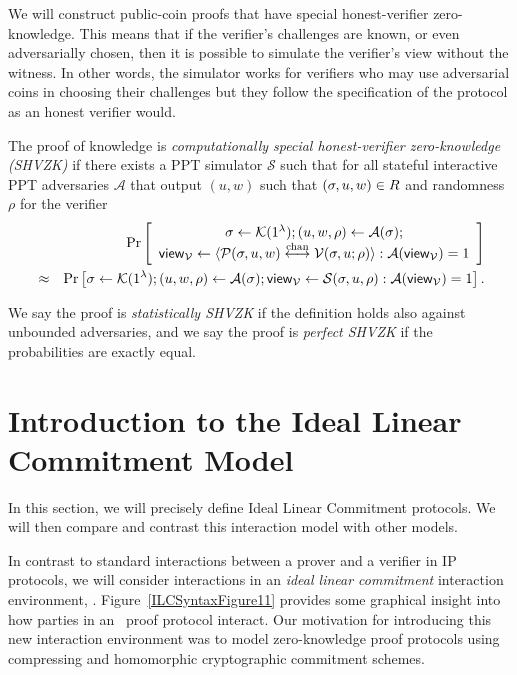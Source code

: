 We will construct public-coin proofs that have special honest-verifier zero-knowledge. This means that if the verifier's challenges are known, or even adversarially chosen, then it is possible to simulate the verifier's view without the witness.  In other words, the simulator works for verifiers who may use adversarial coins in choosing their challenges but they follow the specification of the protocol as an honest verifier would. 
\begin{definition}
The proof of knowledge is \emph{computationally special honest-verifier zero-knowledge (SHVZK)} if there exists a PPT simulator $\mathcal{S}$ such that for all stateful interactive PPT adversaries $\mathcal{A}$ that output $(u,w)$ such that $(\mathsf{\sigma},u,w)\in R$ and randomness $\rho$ for the verifier
\begin{eqnarray*}
&&\Pr \left[ \begin{array}{c}\mathsf{\sigma}\gets \mathcal{K}(1^{\lambda});(u, w, \rho) \leftarrow\mathcal{A}(\mathsf{\sigma}); \\
\mathsf{view}_{\mathcal{V}}\leftarrow \langle \mathcal{P}(\mathsf{\sigma},u,w)\overset{\textnormal{chan}}{\longleftrightarrow} \mathcal{V}(\mathsf{\sigma},u;\rho)\rangle: \mathcal{A}(\mathsf{view}_{\mathcal{V}})=1\end{array} \right]\\
&\approx &\Pr \left[ \mathsf{\sigma}\gets \mathcal{K}(1^{\lambda});(u, w, \rho) \leftarrow\mathcal{A}(\mathsf{\sigma}); \mathsf{view}_{\mathcal{V}}\leftarrow \mathcal{S}(\mathsf{\sigma},u,\rho): \mathcal{A}(\mathsf{view}_{\mathcal{V}})=1\right].
\end{eqnarray*}

We say the proof is \emph{statistically SHVZK} if the definition holds also against unbounded adversaries, and we say the proof is \emph{perfect SHVZK} if the probabilities are exactly equal.
\end{definition}

\section{Introduction to the Ideal Linear Commitment Model}
\label{formalILCmodel}

In this section, we will precisely define Ideal Linear Commitment protocols. We will then compare and contrast this interaction model with other models.

In contrast to standard interactions between a prover and a verifier in IP protocols, we will consider interactions in an \emph{ideal linear commitment} interaction environment, \ILC. Figure~\ref{ILCSyntaxFigure11} provides some graphical insight into how parties in an \ILC\ proof protocol interact. Our motivation for introducing this new interaction environment was to model zero-knowledge proof protocols using compressing and homomorphic cryptographic commitment schemes.

